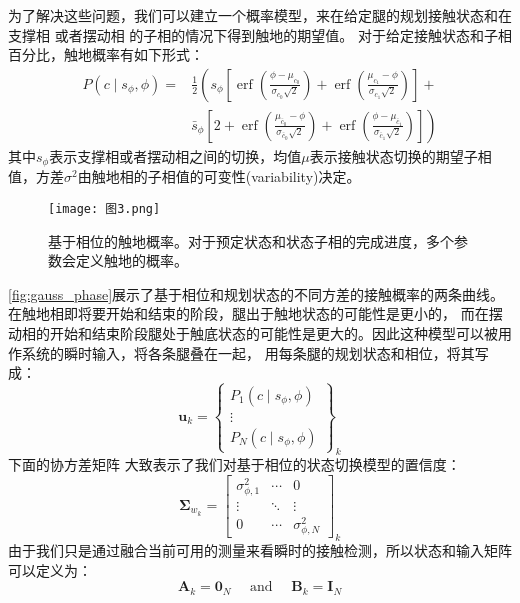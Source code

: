 为了解决这些问题，我们可以建立一个概率模型，来在给定腿的规划接触状态和在支撑相 或者摆动相 的子相的情况下得到触地的期望值。
对于给定接触状态和子相百分比，触地概率有如下形式：
\begin{equation}
    \label{equ:est_contact_prob}
    \begin{aligned}
        P\left(c \mid s_\phi, \phi\right)= & \frac{1}{2}\left(s_\phi\left[\operatorname{erf}\left(\frac{\phi-\mu_{c_0}}{\sigma_{c_0} \sqrt{2}}\right)+\operatorname{erf}\left(\frac{\mu_{c_1}-\phi}{\sigma_{c_1} \sqrt{2}}\right)\right]+\right. \\
        & \left.\bar{s}_\phi\left[2+\operatorname{erf}\left(\frac{\mu_{\bar{c}_0}-\phi}{\sigma_{\bar{c}_0} \sqrt{2}}\right)+\operatorname{erf}\left(\frac{\phi-\mu_{\bar{c}_1}}{\sigma_{\bar{c}_1} \sqrt{2}}\right)\right]\right)
        \end{aligned}
\end{equation}
其中$s_{\phi}$表示支撑相或者摆动相之间的切换，均值$\mu$表示接触状态切换的期望子相值，方差$\sigma^2$由触地相的子相值的可变性(variability)决定。
\begin{figure}[htbp]
    \centering
    \texttt{[image: 图3.png]}
    \caption{\label{fig:gauss_phase}基于相位的触地概率。对于预定状态和状态子相的完成进度，多个参数会定义触地的概率。}
\end{figure}
\autoref{fig:gauss_phase}展示了基于相位和规划状态的不同方差的接触概率的两条曲线。
在触地相即将要开始和结束的阶段，腿出于触地状态的可能性是更小的，
而在摆动相的开始和结束阶段腿处于触底状态的可能性是更大的。因此这种模型可以被用作系统的瞬时输入，将各条腿叠在一起，
用每条腿的规划状态和相位，将其写成：
\begin{equation}
    \label{equ:est_input}
    \boldsymbol{u}_k=\left\{\begin{array}{c}
        P_1\left(c \mid s_\phi, \phi\right) \\
        \vdots \\
        P_N\left(c \mid s_\phi, \phi\right)
        \end{array}\right\}_k
\end{equation}
下面的协方差矩阵 大致表示了我们对基于相位的状态切换模型的置信度：
\begin{equation}
    \label{equ:est_process_noise}
    \boldsymbol{\Sigma}_{w_k}=\left[\begin{array}{ccc}
        \sigma_{\phi, 1}^2 & \cdots & 0 \\
        \vdots & \ddots & \vdots \\
        0 & \cdots & \sigma_{\phi, N}^2
        \end{array}\right]_k
\end{equation}
由于我们只是通过融合当前可用的测量来看瞬时的接触检测，所以状态和输入矩阵可以定义为：
\begin{equation}
    \label{equ:est_process_matrix}
    \boldsymbol{A}_k=\mathbf{0}_N \quad \text { and } \quad \boldsymbol{B}_k=\mathbf{I}_N
\end{equation}

